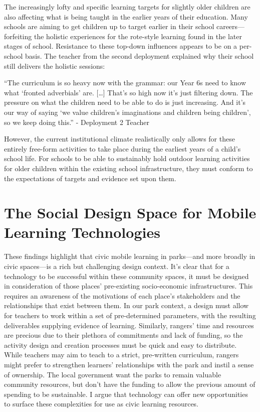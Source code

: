 The increasingly lofty and specific learning targets for slightly older children are also affecting what is being taught in the earlier years of their education. Many schools are aiming to get children up to target earlier in their school careers---forfeiting the holistic experiences for the rote-style learning found in the later stages of school. Resistance to these top-down influences appears to be on a per-school basis. The teacher from the second deployment explained why their school still delivers the holistic sessions:

\begin{displayquote}
“The curriculum is so heavy now with the grammar: our Year 6s need to know what `fronted adverbials' are. […] That's so high now it’s just filtering down. The pressure on what the children need to be able to do is just increasing. And it's our way of saying `we value children’s imaginations and children being children', so we keep doing this.” - Deployment 2 Teacher
\end{displayquote}

However, the current institutional climate realistically only allows for these entirely free-form activities to take place during the earliest years of a child’s school life. For schools to be able to sustainably hold outdoor learning activities for older children within the existing school infrastructure, they must conform to the expectations of targets and evidence set upon them.

\section{The Social Design Space for Mobile Learning Technologies}

These findings highlight that civic mobile learning in parks---and more broadly in civic spaces---is a rich but challenging design context. It's clear that for a technology to be successful within these community spaces, it must be designed in consideration of those places' pre-existing socio-economic infrastructures. This requires an awareness of the motivations of each place’s stakeholders and the relationships that exist between them. In our park context, a design must allow for teachers to work within a set of pre-determined parameters, with the resulting deliverables supplying evidence of learning. Similarly, rangers’ time and resources are precious due to their plethora of commitments and lack of funding, so the activity design and creation processes must be quick and easy to distribute. While teachers may aim to teach to a strict, pre-written curriculum, rangers might prefer to strengthen learners’ relationships with the park and instil a sense of ownership. The local government want the parks to remain valuable community resources, but don’t have the funding to allow the previous amount of spending to be sustainable. I argue that technology can offer new opportunities to surface these complexities for use as civic learning resources.

